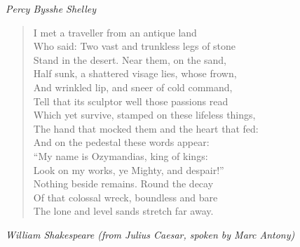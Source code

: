 \documentclass[10pt]{memoir}
\newcommand{\poemauthor}[1]{{\small\itshape #1}\par\medskip}
\begin{document}
\poemauthor{Percy Bysshe Shelley}

\begin{verse}
I met a traveller from an antique land\\
Who said: Two vast and trunkless legs of stone\\
Stand in the desert. Near them, on the sand,\\
Half sunk, a shattered visage lies, whose frown,\\
And wrinkled lip, and sneer of cold command,\\
Tell that its sculptor well those passions read\\
Which yet survive, stamped on these lifeless things,\\
The hand that mocked them and the heart that fed:\\
And on the pedestal these words appear:\\
``My name is Ozymandias, king of kings:\\
Look on my works, ye Mighty, and despair!''\\
Nothing beside remains. Round the decay\\
Of that colossal wreck, boundless and bare\\
The lone and level sands stretch far away.
\end{verse}

\poemauthor{William Shakespeare (from \textit{Julius Caesar}, spoken by Marc Antony)}
\end{document}
